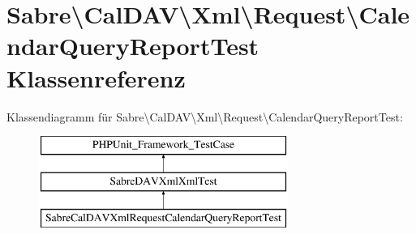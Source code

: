 \hypertarget{class_sabre_1_1_cal_d_a_v_1_1_xml_1_1_request_1_1_calendar_query_report_test}{}\section{Sabre\textbackslash{}Cal\+D\+AV\textbackslash{}Xml\textbackslash{}Request\textbackslash{}Calendar\+Query\+Report\+Test Klassenreferenz}
\label{class_sabre_1_1_cal_d_a_v_1_1_xml_1_1_request_1_1_calendar_query_report_test}
Klassendiagramm für Sabre\textbackslash{}Cal\+D\+AV\textbackslash{}Xml\textbackslash{}Request\textbackslash{}Calendar\+Query\+Report\+Test\+:\begin{figure}[H]
\begin{center}
\leavevmode
\includegraphics[height=3.000000cm]{class_sabre_1_1_cal_d_a_v_1_1_xml_1_1_request_1_1_calendar_query_report_test}
\end{center}
\end{figure}
